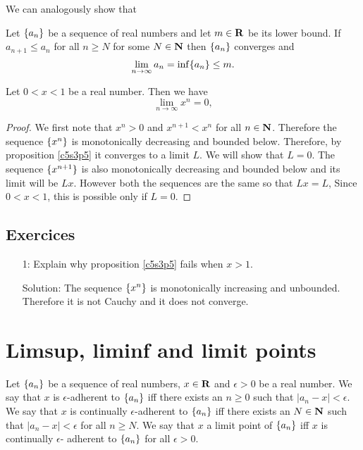 We can analogously show that
\begin{prop}\label{c5s3p4}
Let $\{a_n\}$ be a sequence of real numbers and let $m \in \mathbf{R}$ be its
lower bound. If $a_{n+1} \le a_n$ for all $n \ge N$ for some $N \in \mathbf{N}$
then $\{a_n\}$ converges and
\[
\lim_{n \rightarrow \infty}a_n = \inf\{a_n\} \le m.
\]
\end{prop}

\begin{prop}\label{c5s3p5}
Let $0 < x < 1$ be a real number. Then we have
\[
\lim_{n \rightarrow \infty}x^n = 0,
\]
\end{prop}
\begin{proof}
We first note that $x^n > 0$ and $x^{n+1} < x^n$ for all $n \in \mathbf{N}$. 
Therefore the sequence $\{x^n\}$ is monotonically decreasing and bounded
below. Therefore, by proposition \ref{c5s3p5} it converges to a limit $L$.
We will show that $L = 0$. The sequence $\{x^{n+1}\}$ is also monotonically
decreasing and bounded below and its limit will be $Lx$. However both the
sequences are the same so that $Lx = L$, Since $0 < x < 1$, this is possible
only if $L = 0$.
\end{proof}

\subsection{Exercices}
\begin{enumerate}
\item[1:] Explain why proposition \ref{c5s3p5} fails when $x > 1$.
\item[Solution:] The sequence $\{x^n\}$ is monotonically increasing and
unbounded. Therefore it is not Cauchy and it does not converge.
\end{enumerate}

\section{Limsup, liminf and limit points}\label{c5s6}
\begin{defn}\label{c5s6d1}
Let $\{a_n\}$ be a sequence of real numbers, $x \in \mathbf{R}$ and $\epsilon
> 0$ be a real number. We say that $x$ is $\epsilon$-adherent to $\{a_n\}$
iff there exists an $n \ge 0$ such that $|a_n - x| < \epsilon$. We say
that $x$ is continually $\epsilon$-adherent to $\{a_n\}$ iff there exists
an $N \in \mathbf{N}$ such that $|a_n - x| < \epsilon$ for all $n \ge N$. We say
that $x$ a limit point of $\{a_n\}$ iff $x$ is continually $\epsilon$-
adherent to $\{a_n\}$ for all $\epsilon > 0$.
\end{defn}

